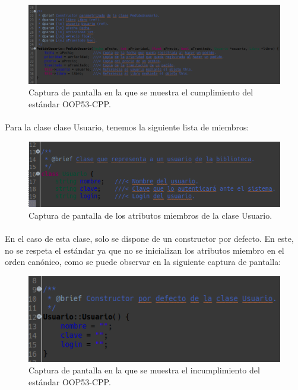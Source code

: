 			\begin{figure}[H]
				\centering
				\includegraphics[scale=0.45]{img/captura31.png}
				\caption{Captura de pantalla en la que se muestra el cumplimiento del estándar OOP53-CPP.}
				\label{captura31}
			\end{figure}
		
			\paragraph{}Para la clase clase Usuario, tenemos la siguiente lista de miembros:
			
			\begin{figure}[H]
				\centering
				\includegraphics[scale=0.8]{img/captura32.png}
				\caption{Captura de pantalla de los atributos miembros de la clase Usuario.}
				\label{captura32}
			\end{figure}
		
			\paragraph{}En el caso de esta clase, solo se dispone de un constructor por defecto. En este, no se respeta el estándar ya que no se inicializan los atributos miembro en el orden canónico, como se puede observar en la siguiente captura de pantalla:
			
			\begin{figure}[H]
				\centering
				\includegraphics[scale=0.9]{img/captura33.png}
				\caption{Captura de pantalla en la que se muestra el incumplimiento del estándar OOP53-CPP.}
				\label{captura33}
			\end{figure}
			
